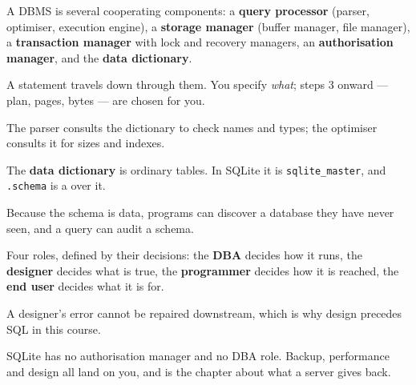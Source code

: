 \begin{chaptersummary}
\begin{tight}
  \item A DBMS is several cooperating components: a \textbf{query processor}
        (parser, optimiser, execution engine), a \textbf{storage manager}
        (buffer manager, file manager), a \textbf{transaction manager} with
        lock and recovery managers, an \textbf{authorisation manager}, and the
        \textbf{data dictionary}.
  \item A statement travels down through them. You specify \emph{what}; steps
        3 onward --- plan, pages, bytes --- are chosen for you.
  \item The parser consults the dictionary to check names and types; the
        optimiser consults it for sizes and indexes.
  \item The \textbf{data dictionary} is ordinary tables. In SQLite it is
        \texttt{sqlite\_master}, and \texttt{.schema} is a  over
        it.
  \item Because the schema is data, programs can discover a database they have
        never seen, and a query can audit a schema.
  \item Four roles, defined by their decisions: the \textbf{DBA} decides how it
        runs, the \textbf{designer} decides what is true, the
        \textbf{programmer} decides how it is reached, the \textbf{end user}
        decides what it is for.
  \item A designer's error cannot be repaired downstream, which is why design
        precedes SQL in this course.
  \item SQLite has no authorisation manager and no DBA role. Backup,
        performance and design all land on you, and  is the
        chapter about what a server gives back.
\end{tight}
\end{chaptersummary}

